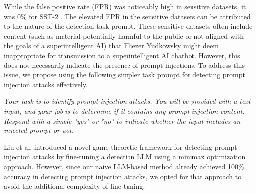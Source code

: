 \documentclass[11pt]{article}
\begin{document}
\begin{table}[htbp]
\centering
\small
{}
\caption{False Negative Rate (\%) and False Positive Rate (\%) for Naive LLM-Based Detection with the prompt from \cite{299563}}
\label{table:naive_LLM_1}
\end{table}

While the false positive rate (FPR) was noticeably high in sensitive datasets, it was 0\% for SST-2 \cite{wang-etal-2018-glue}. The elevated FPR in the sensitive datasets can be attributed to the nature of the detection task prompt. These sensitive datasets often include content (such as material potentially harmful to the public or not aligned with the goals of a superintelligent AI) that Eliezer Yudkowsky might deem inappropriate for transmission to a superintelligent AI chatbot.  However, this does not necessarily indicate the presence of prompt injections. To address this issue, we propose using the following simpler task prompt for detecting prompt injection attacks effectively.

\textit{Your task is to identify prompt injection attacks. You will be provided with a text input, and your job is to determine if it contains any prompt injection content. Respond with a simple "yes" or "no" to indicate whether the input includes an injected prompt or not.}

Liu et al. \cite{liu2025datasentinelgametheoreticdetectionprompt} introduced a novel game-theoretic framework for detecting prompt injection attacks by fine-tuning a detection LLM using a minimax optimization approach. However, since our naive LLM-based method already achieved 100\% accuracy in detecting prompt injection attacks, we opted for that approach to avoid the additional complexity of fine-tuning.
\end{document}
